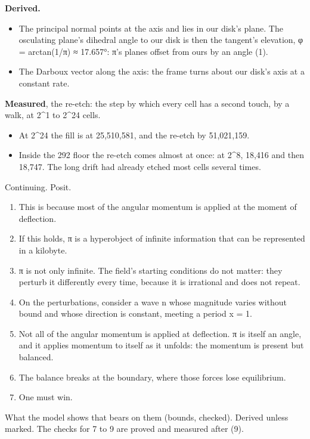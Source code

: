 \textbf{Derived.}

\begin{itemize}
\item The principal normal points at the axis and lies in our disk's plane. The osculating plane's dihedral angle to our disk is then the tangent's elevation, φ = arctan(1/π) ≈ 17.657°: π's planes offset from ours by an angle (1).
\item The Darboux vector along the axis: the frame turns about our disk's axis at a constant rate.
\end{itemize}

\textbf{Measured}, the re-etch: the step by which every cell has a second touch, by a walk, at 2\textasciicircum{}1 to 2\textasciicircum{}24 cells.

\begin{itemize}
\item At 2\textasciicircum{}24 the fill is at 25,510,581, and the re-etch by 51,021,159.
\item Inside the 292 floor the re-etch comes almost at once: at 2\textasciicircum{}8, 18,416 and then 18,747. The long drift had already etched most cells several times.
\end{itemize}

Continuing. Posit.

\begin{enumerate}
\item This is because most of the angular momentum is applied at the moment of deflection.
\item If this holds, π is a hyperobject of infinite information that can be represented in a kilobyte.
\item π is not only infinite. The field's starting conditions do not matter: they perturb it differently every time, because it is irrational and does not repeat.
\item On the perturbations, consider a wave n whose magnitude varies without bound and whose direction is constant, meeting a period x = 1.
\item Not all of the angular momentum is applied at deflection. π is itself an angle, and it applies momentum to itself as it unfolds: the momentum is present but balanced.
\item The balance breaks at the boundary, where those forces lose equilibrium.
\item One must win.
\end{enumerate}

What the model shows that bears on them (bounds, checked). Derived unless marked. The checks for 7 to 9 are proved and measured after (9).

